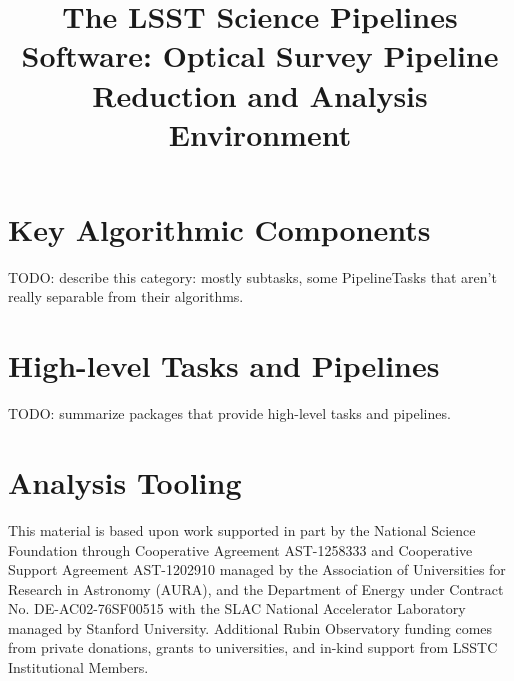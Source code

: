 \documentclass[twocolumn,longbib]{aastex7}
\begin{document}
\title{The LSST Science Pipelines Software: Optical Survey Pipeline Reduction and Analysis Environment}











\section{Key Algorithmic Components}

TODO: describe this category: mostly subtasks, some PipelineTasks that aren't really separable from their algorithms.









\section{High-level Tasks and Pipelines}

TODO: summarize packages that provide high-level tasks and pipelines.










\section{Analysis Tooling}
\label{sec:analysis}







\begin{acknowledgments}
This material is based upon work supported in part by the National Science Foundation through Cooperative Agreement AST-1258333 and Cooperative Support Agreement AST-1202910 managed by the Association of Universities for Research in Astronomy (AURA), and the Department of Energy under Contract No. DE-AC02-76SF00515 with the SLAC National Accelerator Laboratory managed by Stanford University.
Additional Rubin Observatory funding comes from private donations, grants to universities, and in-kind support from LSSTC Institutional Members.
\end{acknowledgments}
\end{document}
